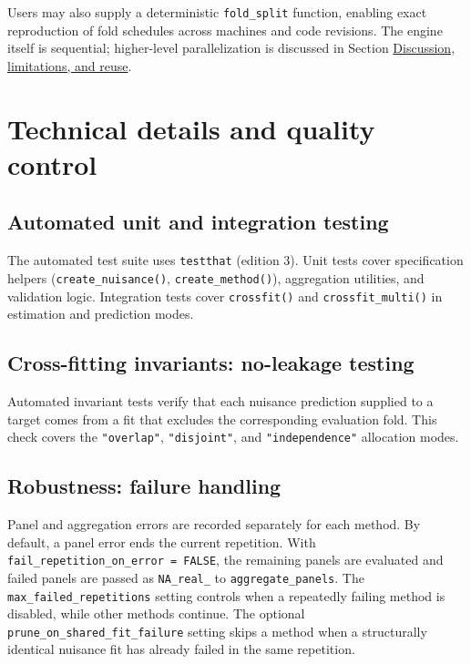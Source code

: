 Users may also supply a deterministic \texttt{fold\_split} function, enabling exact reproduction of fold schedules across machines and code revisions. The engine itself is sequential; higher-level parallelization is discussed in Section \hyperref[sec:discussion]{Discussion, limitations, and reuse}.

\section{Technical details and quality control}\label{sec:technical}

\subsection{Automated unit and integration testing}\label{automated-unit-and-integration-testing}

The automated test suite uses \texttt{testthat} (edition 3). Unit tests cover specification helpers (\texttt{create\_nuisance()}, \texttt{create\_method()}), aggregation utilities, and validation logic. Integration tests cover \texttt{crossfit()} and \texttt{crossfit\_multi()} in estimation and prediction modes.

\subsection{Cross-fitting invariants: no-leakage testing}\label{cross-fitting-invariants-no-leakage-testing}

Automated invariant tests verify that each nuisance prediction supplied to a target comes from a fit that excludes the corresponding evaluation fold. This check covers the \texttt{"overlap"}, \texttt{"disjoint"}, and \texttt{"independence"} allocation modes.

\subsection{Robustness: failure handling}\label{robustness-failure-handling}

Panel and aggregation errors are recorded separately for each method. By default, a panel error ends the current repetition. With \texttt{fail\_repetition\_on\_error\ =\ FALSE}, the remaining panels are evaluated and failed panels are passed as \texttt{NA\_real\_} to \texttt{aggregate\_panels}. The \texttt{max\_failed\_repetitions} setting controls when a repeatedly failing method is disabled, while other methods continue. The optional \texttt{prune\_on\_shared\_fit\_failure} setting skips a method when a structurally identical nuisance fit has already failed in the same repetition.

